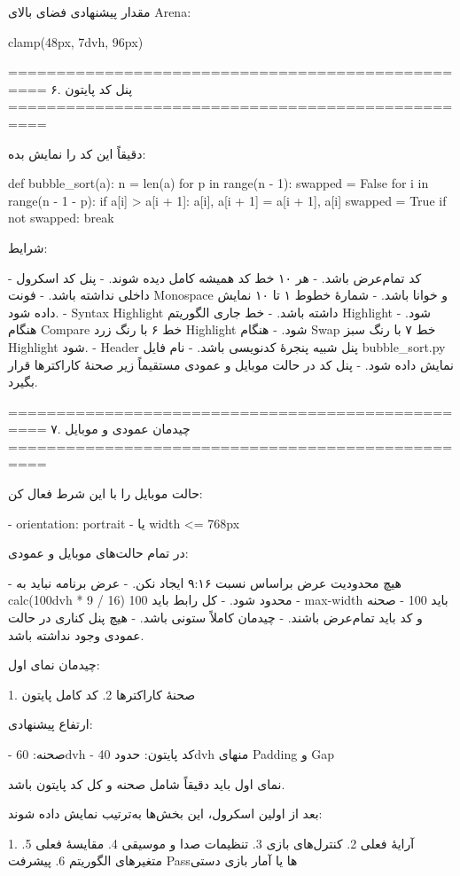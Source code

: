 مقدار پیشنهادی فضای بالای Arena:

clamp(48px, 7dvh, 96px)

==================================================
۶. پنل کد پایتون
==================================================

دقیقاً این کد را نمایش بده:

def bubble_sort(a):
    n = len(a)
    for p in range(n - 1):
        swapped = False
        for i in range(n - 1 - p):
            if a[i] > a[i + 1]:
                a[i], a[i + 1] = a[i + 1], a[i]
                swapped = True
        if not swapped:
            break

شرایط:

- کد تمام‌عرض باشد.
- هر ۱۰ خط کد همیشه کامل دیده شوند.
- پنل کد اسکرول داخلی نداشته باشد.
- فونت Monospace و خوانا باشد.
- شمارهٔ خطوط ۱ تا ۱۰ نمایش داده شود.
- Syntax Highlight داشته باشد.
- خط جاری الگوریتم Highlight شود.
- هنگام Compare خط ۶ با رنگ زرد Highlight شود.
- هنگام Swap خط ۷ با رنگ سبز Highlight شود.
- Header پنل شبیه پنجرهٔ کدنویسی باشد.
- نام فایل bubble_sort.py نمایش داده شود.
- پنل کد در حالت موبایل و عمودی مستقیماً زیر صحنهٔ کاراکترها قرار بگیرد.

==================================================
۷. چیدمان عمودی و موبایل
==================================================

حالت موبایل را با این شرط فعال کن:

- orientation: portrait
- یا width <= 768px

در تمام حالت‌های موبایل و عمودی:

- هیچ محدودیت عرض براساس نسبت ۹:۱۶ ایجاد نکن.
- عرض برنامه نباید به calc(100dvh * 9 / 16) محدود شود.
- کل رابط باید 100%
- max-width باید 100%
- صحنه و کد باید تمام‌عرض باشند.
- چیدمان کاملاً ستونی باشد.
- هیچ پنل کناری در حالت عمودی وجود نداشته باشد.

چیدمان نمای اول:

1. صحنهٔ کاراکترها
2. کد کامل پایتون

ارتفاع پیشنهادی:

- صحنه: 60dvh
- کد پایتون: حدود 40dvh منهای Padding و Gap

نمای اول باید دقیقاً شامل صحنه و کل کد پایتون باشد.

بعد از اولین اسکرول، این بخش‌ها به‌ترتیب نمایش داده شوند:

1. آرایهٔ فعلی
2. کنترل‌های بازی
3. تنظیمات صدا و موسیقی
4. مقایسهٔ فعلی
5. متغیرهای الگوریتم
6. پیشرفت Passها یا آمار بازی دستی

